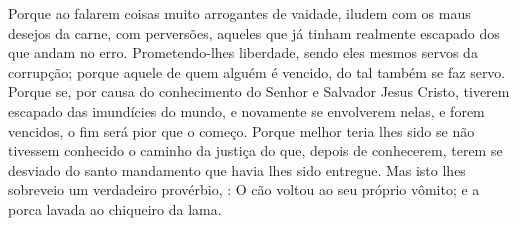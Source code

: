 {  Porque ao falarem coisas muito arrogantes de vaidade, iludem com os maus desejos da carne,
{} com perversões, aqueles que já tinham realmente escapado dos que andam no erro.
  Prometendo-lhes liberdade,
{} sendo eles mesmos servos da corrupção; porque aquele de quem alguém é vencido, do tal também se faz servo.
  Porque se, por causa do conhecimento do Senhor e Salvador Jesus Cristo, tiverem escapado das imundícies do mundo, e novamente se envolverem nelas, e forem vencidos, o fim será pior que o começo.
  Porque melhor teria lhes sido se não tivessem conhecido o caminho da justiça do que, depois de conhecerem, terem se desviado do santo mandamento que havia lhes sido entregue.
  Mas isto lhes sobreveio
{} um verdadeiro provérbio,
{} : O cão voltou ao seu próprio vômito; e a porca lavada
{} ao chiqueiro da lama.
\par }

